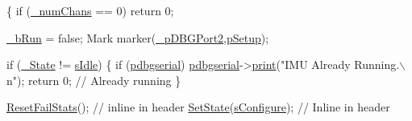 \begin{DoxyCode}
\{
    \textcolor{keywordflow}{if} (\hyperlink{class_i_m_u_a27df580b4559aaf3234469bfe16eb158}{_numChans} == 0) \textcolor{keywordflow}{return} 0;
    
    \hyperlink{class_i_m_u_a547fe1fb8adb34917aa08663919b97df}{_bRun} = \textcolor{keyword}{false};
    Mark marker(\hyperlink{class_i_m_u_a1cf5672a28049d5885a2958010188928}{_pDBGPort2},\hyperlink{class_i_m_u_ad01128d82debc1e4213affe4858f3144a73419f05716e41c972241a4fc0c6ead0}{pSetup});
    
    \textcolor{keywordflow}{if} (\hyperlink{class_i_m_u_a2e3c70d02cc2b3dd98ce8153d02cf04e}{_State} != \hyperlink{class_i_m_u_a7b5e1bf1cf1407b3e4cf0dd2e18b523fa82181a217d68f26cba06b38cfb94c1bc}{sIdle}) \{
        \textcolor{keywordflow}{if} (\hyperlink{_gyro_acc_8cpp_a953e918236b1fd18b8f07bad1217ecbe}{pdbgserial}) 
            \hyperlink{_gyro_acc_8cpp_a953e918236b1fd18b8f07bad1217ecbe}{pdbgserial}->\hyperlink{class_print_aa7b0a6dc63e3d27effd8459e3d443b83}{print}(\textcolor{stringliteral}{"IMU Already Running.\(\backslash\)n"});
        \textcolor{keywordflow}{return} 0; \textcolor{comment}{// Already running}
    \}
    
    \hyperlink{class_i_m_u_a89de27b845ce9e103436cfb7ae8e6441}{ResetFailStats}(); \textcolor{comment}{// inline in header}
    \hyperlink{class_i_m_u_a5d80a28d98df12c536f525b56b7e5abe}{SetState}(\hyperlink{class_i_m_u_a7b5e1bf1cf1407b3e4cf0dd2e18b523fae3a15f0845da0f426c48b6bd9ed01b21}{sConfigure}); \textcolor{comment}{// Inline in header}
    

\end{DoxyCode}
